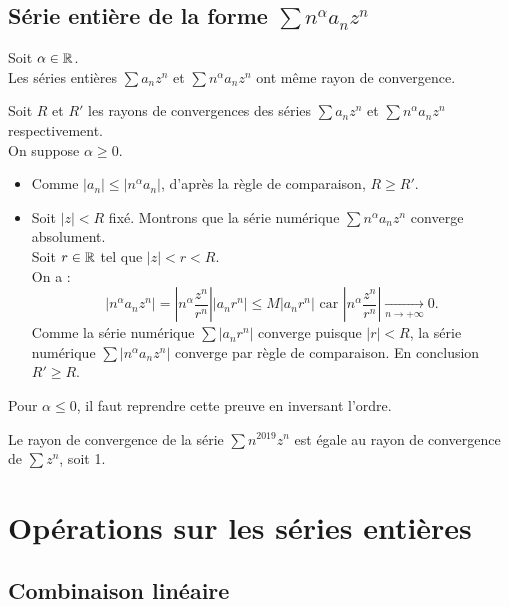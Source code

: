 \documentclass{book}
\begin{document}
\subsection{Série entière de la forme $\sum n^\alpha a_n z^n$}
\begin{Proposition}
Soit $\alpha\in\mathbb{R}$.\\
Les séries entières $\sum a_n z^n$ et $\sum n^\alpha a_n z^n$ ont même rayon de convergence.
\end{Proposition}
\begin{Demonstration}
Soit $R$ et $R'$ les rayons de convergences des séries $\sum a_n z^n$ et $\sum n^\alpha a_n z^n$ respectivement.\\
On suppose $\alpha\geq 0.$
\begin{itemize}
\item Comme $|a_n|\leq |n^\alpha a_n|$, d'après la règle de comparaison, $R\geq R'$.
\item Soit $|z|<R$ fixé. Montrons que la série numérique  $\sum n^\alpha a_n z^n$ converge absolument.\\
Soit $r \in \mathbb{R}$ tel que $ |z|<r<R$.\\
On a :
$$ |n^\alpha a_n z^n| = |n^\alpha  \frac{z^n}{r^n}| | a_n r^n| \leq M | a_n r^n| \text{ car }  
|n^\alpha  \frac{z^n}{r^n}|\xrightarrow[n\to +\infty]{}0.$$
Comme la série numérique  $\sum | a_n r^n|$ converge puisque $|r|<R$, la série numérique  $\sum |n^\alpha a_n z^n|$ converge par règle de comparaison. En conclusion $R'\geq R$.
\end{itemize}
Pour $\alpha\leq 0$, il faut reprendre cette preuve en inversant l'ordre.
\end{Demonstration}
\begin{Exemple}
Le rayon de convergence de la série $\sum n^{2019}  z^n$ est égale au rayon de convergence de $\sum  z^n$, soit 1. 
\end{Exemple}

\section{Opérations sur les séries entières}

\subsection{Combinaison linéaire}
\end{document}
